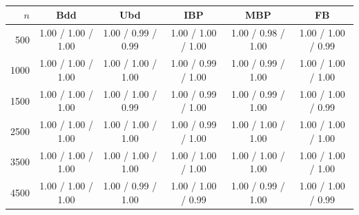 \begin{table}[ht!]
    \centering
    \small
    \begin{tabular}{r c c c c c}
    \hline
    $n$ & Bdd & Ubd & IBP & MBP & FB \\
    \hline
    500 & 1.00 / 1.00 / 1.00 & 1.00 / 0.99 / 0.99 & 1.00 / 1.00 / 1.00 & 1.00 / 0.98 / 1.00 & 1.00 / 1.00 / 0.99 \\
    1000 & 1.00 / 1.00 / 1.00 & 1.00 / 1.00 / 1.00 & 1.00 / 0.99 / 1.00 & 1.00 / 0.99 / 1.00 & 1.00 / 1.00 / 1.00 \\
    1500 & 1.00 / 1.00 / 1.00 & 1.00 / 1.00 / 0.99 & 1.00 / 0.99 / 1.00 & 1.00 / 0.99 / 1.00 & 1.00 / 1.00 / 0.99 \\
    2500 & 1.00 / 1.00 / 1.00 & 1.00 / 1.00 / 1.00 & 1.00 / 0.99 / 1.00 & 1.00 / 1.00 / 1.00 & 1.00 / 1.00 / 1.00 \\
    3500 & 1.00 / 1.00 / 1.00 & 1.00 / 1.00 / 1.00 & 1.00 / 1.00 / 1.00 & 1.00 / 1.00 / 1.00 & 1.00 / 1.00 / 1.00 \\
    4500 & 1.00 / 1.00 / 1.00 & 1.00 / 0.99 / 1.00 & 1.00 / 1.00 / 0.99 & 1.00 / 0.99 / 1.00 & 1.00 / 1.00 / 0.99 \\
    \hline
    \end{tabular}
    \caption{}
    \label{tab:Exp1_features_Mfix_zipfs}
\end{table}
